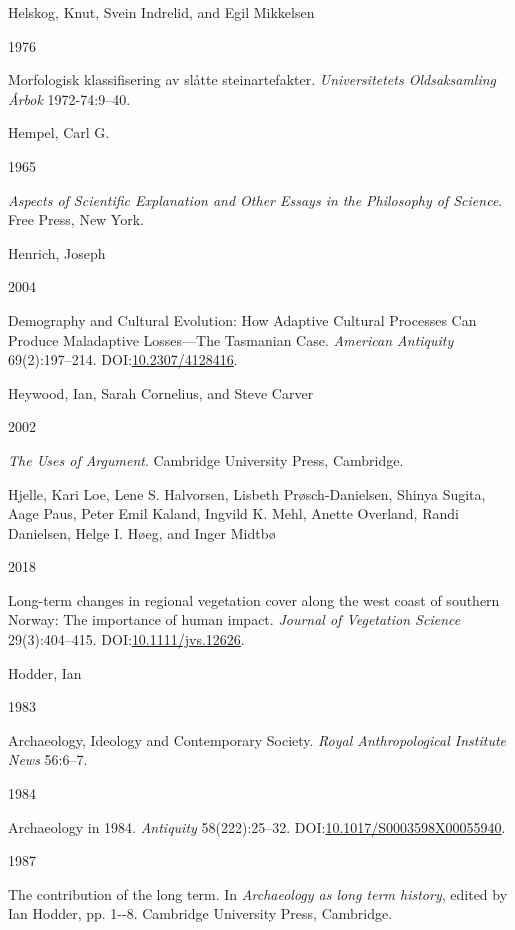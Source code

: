 \documentclass[
  12pt,
  a4paper,
  oneside]{book}
\newlength{\cslhangindent}
\newlength{\csllabelwidth}
\newlength{\cslentryspacingunit} %
\newenvironment{CSLReferences}[2] %
 {%
  \setlength{\parindent}{0pt}
  \ifodd #1
  \let\oldpar\par
  \def\par{\hangindent=\cslhangindent\oldpar}
  \fi
  \setlength{\parskip}{#2\cslentryspacingunit}
 }%
 {}
\newcommand{\CSLBlock}[1]{#1\hfill\break}
\newcommand{\CSLLeftMargin}[1]{\parbox[t]{\csllabelwidth}{#1}}
\newcommand{\CSLRightInline}[1]{\parbox[t]{\linewidth - \csllabelwidth}{#1}\break}
\begin{document}
\begin{CSLReferences}{0}{0}
\leavevmode{}%
\CSLBlock{Helskog, Knut, Svein Indrelid, and Egil Mikkelsen}
\CSLLeftMargin{ 1976}%
\CSLRightInline{{Morfologisk klassifisering av slåtte steinartefakter}. \emph{Universitetets Oldsaksamling Årbok} 1972-74:9--40.}

\leavevmode{}%
\CSLBlock{Hempel, Carl G.}
\CSLLeftMargin{ 1965}%
\CSLRightInline{\emph{{Aspects of Scientific Explanation and Other Essays in the Philosophy of Science}}. Free Press, New York.}

\leavevmode{}%
\CSLBlock{Henrich, Joseph}
\CSLLeftMargin{ 2004}%
\CSLRightInline{{Demography and Cultural Evolution: How Adaptive Cultural Processes Can Produce Maladaptive Losses---The Tasmanian Case}. \emph{American Antiquity} 69(2):197--214. DOI:\href{https://doi.org/10.2307/4128416}{10.2307/4128416}.}

\leavevmode{}%
\CSLBlock{Heywood, Ian, Sarah Cornelius, and Steve Carver}
\CSLLeftMargin{ 2002}%
\CSLRightInline{\emph{{The Uses of Argument}}. Cambridge University Press, Cambridge.}

\leavevmode{}%
\CSLBlock{Hjelle, Kari Loe, Lene S. Halvorsen, Lisbeth Prøsch-Danielsen, Shinya Sugita, Aage Paus, Peter Emil Kaland, Ingvild K. Mehl, Anette Overland, Randi Danielsen, Helge I. Høeg, and Inger Midtbø}
\CSLLeftMargin{ 2018}%
\CSLRightInline{{Long-term changes in regional vegetation cover along the west coast of southern Norway: The importance of human impact}. \emph{Journal of Vegetation Science} 29(3):404--415. DOI:\href{https://doi.org/10.1111/jvs.12626}{10.1111/jvs.12626}.}

\leavevmode{}%
\CSLBlock{Hodder, Ian}
\CSLLeftMargin{ 1983}%
\CSLRightInline{Archaeology, Ideology and Contemporary Society. \emph{Royal Anthropological Institute News} 56:6--7.}

\leavevmode{}%
\CSLLeftMargin{ 1984 }%
\CSLRightInline{Archaeology in 1984. \emph{Antiquity} 58(222):25--32. DOI:\href{https://doi.org/10.1017/S0003598X00055940}{10.1017/S0003598X00055940}.}

\leavevmode{}%
\CSLLeftMargin{ 1987 }%
\CSLRightInline{{The contribution of the long term}. In \emph{{Archaeology as long term history}}, edited by Ian Hodder, pp. 1-\/-8. Cambridge University Press, Cambridge.}


\end{CSLReferences}
\end{document}
